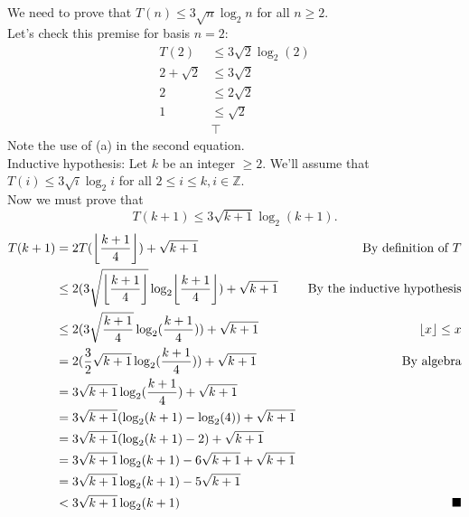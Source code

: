 \documentclass{article}
\DeclarePairedDelimiter{\floor}{\lfloor}{\rfloor}
\begin{document}
\subsection{}
We need to prove that $T(n) \leq 3\sqrt{n}\log_2 n$ for all $n\geq 2$.\\
Let's check this premise for basis $n=2$:
\begin{align*}
    T(2) &\leq 3\sqrt{2}\log_2(2) \\
    2 + \sqrt{2} &\leq 3\sqrt{2} \\
    2 &\leq 2\sqrt{2} \\
    1 &\leq \sqrt{2} \\
    &\top
\end{align*}
Note the use of (a) in the second equation.\\
Inductive hypothesis: Let $k$ be an integer $\geq 2$. We'll assume that $T(i) \leq 3\sqrt{i}\log_2 i$ for all $2 \leq i\leq k, i\in \mathbb{Z}$.\\
Now we must prove that
\begin{equation*}
    T(k+1) \leq 3\sqrt{k+1}\log_2(k+1).
\end{equation*}
\begin{align*}
    T(k+1) &= 2T(\floor*{\frac{k+1}{4}}) + \sqrt{k+1} & \text{By definition of $T$}\\
           &\leq 2(3\sqrt{\floor*{\frac{k+1}{4}}}\log_2\floor*{\frac{k+1}{4}}) + \sqrt{k+1} & \text{By the inductive hypothesis} \\
           &\leq 2(3\sqrt{\frac{k+1}{4}}\log_2(\frac{k+1}{4})) + \sqrt{k+1} & \floor{x} \leq x \\
           &= 2(\frac{3}{2}\sqrt{k+1}\log_2(\frac{k+1}{4})) + \sqrt{k+1} & \text{By algebra} \\
           &= 3\sqrt{k+1}\log_2(\frac{k+1}{4}) + \sqrt{k+1} \\
           &= 3\sqrt{k+1}(\log_2(k+1) - \log_2(4)) + \sqrt{k+1} \\
           &= 3\sqrt{k+1}(\log_2(k+1) - 2) + \sqrt{k+1} \\
           &= 3\sqrt{k+1}\log_2(k+1) - 6\sqrt{k+1} + \sqrt{k+1} \\
           &= 3\sqrt{k+1}\log_2(k+1) - 5\sqrt{k+1} \\
           &< 3\sqrt{k+1}\log_2(k+1)                                    &\blacksquare
\end{align*}
\end{document}
